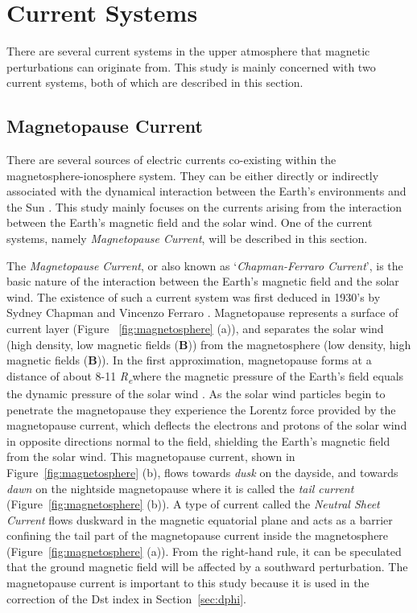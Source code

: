 \documentclass[12pt]{report} %
\begin{document}
\section{Current Systems}
\vspace{-10pt}
There are several current systems in the upper atmosphere that magnetic perturbations can originate from. This study is mainly concerned with two current systems, both of which are described in this section. 

\subsection{Magnetopause Current}

There are several sources of electric currents co-existing within the magnetosphere-ionosphere system. They can be either directly or indirectly associated with the dynamical interaction between the Earth's environments and the Sun \citep{men11}. This study mainly focuses on the currents arising from the interaction between the Earth's magnetic field and the solar wind. One of the current systems, namely \emph{Magnetopause Current}, will be described in this section. 

 The \emph{Magnetopause Current}, or also known as `\emph{Chapman-Ferraro Current}', is the basic nature of the interaction between the Earth's magnetic field and the solar wind. The existence of such a current system was first deduced in 1930's by Sydney Chapman and Vincenzo Ferraro \citep{chapfer31}. Magnetopause represents a surface of current layer (Figure ~\ref{fig:magnetosphere} (a)), and separates the solar wind (high density, low magnetic fields ({\bfseries B})) from the magnetosphere (low density, high magnetic fields ({\bfseries B})). In the first approximation, magnetopause forms at a distance of about 8-11 \textit{R\textsubscript{e}}where the magnetic pressure of the Earth's field equals the dynamic pressure of the solar wind \citep{men11}. As the solar wind particles begin to penetrate the magnetopause they experience the Lorentz force provided by the magnetopause current, which deflects the electrons and protons of the solar wind in opposite directions normal to the field,  shielding the Earth's magnetic field from the solar wind. This magnetopause current, shown in Figure~\ref{fig:magnetosphere} (b), flows towards \emph{dusk} on the dayside, and towards \emph{dawn} on the nightside magnetopause where it is called the \emph{tail current} (Figure~\ref{fig:magnetosphere} (b)). A type of current called the \emph{Neutral Sheet Current} flows duskward in the magnetic equatorial plane and acts as a barrier confining the tail part of the magnetopause current inside the magnetosphere (Figure~\ref{fig:magnetosphere} (a)). From the right-hand rule, it can be speculated that the ground magnetic field will be affected by a southward perturbation. The magnetopause current is important to this study because it is used in the correction of the Dst index in Section~\ref{sec:dphi}.
 
\end{document}
